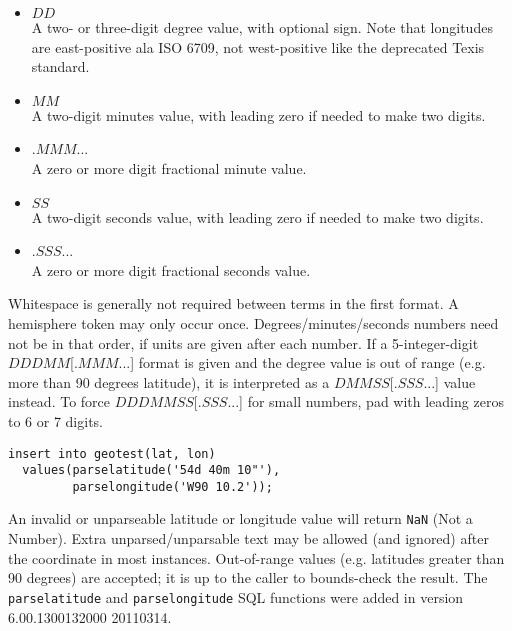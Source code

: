 \begin{itemize}
  \item $DD$ \\

    A two- or three-digit degree value, with optional sign.  Note that
    longitudes are east-positive ala ISO 6709, not west-positive like
    the deprecated Texis standard.

  \item $MM$ \\

    A two-digit minutes value, with leading zero if needed to make two digits.

  \item $.MMM$... \\

    A zero or more digit fractional minute value.

  \item $SS$ \\

    A two-digit seconds value, with leading zero if needed to make two digits.

  \item $.SSS$... \\

    A zero or more digit fractional seconds value.

\end{itemize}

  Whitespace is generally not required between terms in the first
format.  A hemisphere token may only occur once.
Degrees/minutes/seconds numbers need not be in that order, if units
are given after each number.  If a 5-integer-digit $DDDMM$[$.MMM$...]
format is given and the degree value is out of range (e.g. more than
90 degrees latitude), it is interpreted as a $DMMSS$[$.SSS$...] value
instead.  To force $DDDMMSS$[$.SSS$...] for small numbers, pad with
leading zeros to 6 or 7 digits.

\EXAMPLE

\begin{verbatim}
insert into geotest(lat, lon)
  values(parselatitude('54d 40m 10"'),
         parselongitude('W90 10.2'));
\end{verbatim}

\CAVEATS

An invalid or unparseable latitude or longitude value will return
\verb`NaN` (Not a Number).  Extra unparsed/unparsable text may be
allowed (and ignored) after the coordinate in most instances.
Out-of-range values (e.g. latitudes greater than 90 degrees) are
accepted; it is up to the caller to bounds-check the result.  The
\verb`parselatitude` and \verb`parselongitude` SQL functions were
added in version 6.00.1300132000 20110314.

